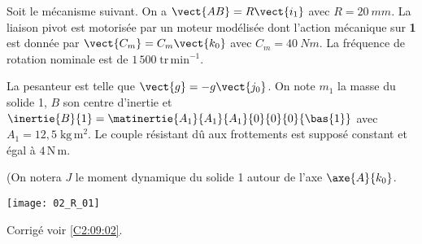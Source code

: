 \normaltrue
\correctionfalse


\setcounter{question}{0}
\ifcorrection
\else
{}
\fi

\ifprof
\else
Soit le mécanisme suivant. On a $\vect{AB}=R\vect{i_1}$ avec $R=\SI{20}{mm}$. La liaison pivot est motorisée par un moteur modélisée dont l'action mécanique sur \textbf{1} est donnée par $\vect{C_m}=C_m \vect{k_0}$ avec $C_m = \SI{40}{Nm}$. La fréquence de rotation nominale est de $1\,500\; \text{tr}\,\text{min}^{-1}$. 

 La pesanteur est telle que $\vect{g}=-g\vect{j_0}$.
On note $m_1$ la masse du solide 1, $B$ son centre d'inertie et $\inertie{B}{1}=\matinertie{A_1}{A_1}{A_1}{0}{0}{0}{\bas{1}}$ avec $A_1 = 12,5\; \text{kg}\,\text{m}^2$.
 Le couple résistant dû aux frottements est supposé constant et égal à $4\, \text{N} \, \text{m}$.

(On notera $J$ le moment dynamique du solide 1 autour de l'axe $\axe{A}{k_0}$.

\begin{center}
\texttt{[image: 02\_R\_01]}
\end{center}

\fi


\ifprof
\else
\fi

\ifprof
\else
\fi



\ifprof
\else
\begin{flushright}
\footnotesize{Corrigé  voir \ref{C2:09:02}.}
\end{flushright}%
\fi